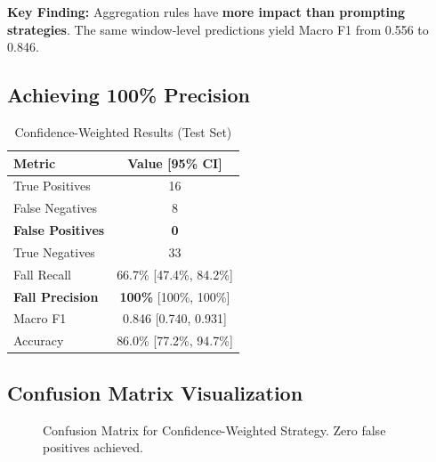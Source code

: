 \documentclass[conference]{IEEEtran}
\begin{document}
\textbf{Key Finding:} Aggregation rules have \textbf{more impact than prompting strategies}. The same window-level predictions yield Macro F1 from 0.556 to 0.846.

\subsection{Achieving 100\% Precision}

\begin{table}[H]
\centering
\caption{Confidence-Weighted Results (Test Set)}
\label{tab:confidence_results}
\begin{tabular}{lc}
\toprule
\textbf{Metric} & \textbf{Value [95\% CI]} \\
\midrule
True Positives & 16 \\
False Negatives & 8 \\
\textbf{False Positives} & \textbf{0} \\
True Negatives & 33 \\
\midrule
Fall Recall & 66.7\% [47.4\%, 84.2\%] \\
\textbf{Fall Precision} & \textbf{100\%} [100\%, 100\%] \\
Macro F1 & 0.846 [0.740, 0.931] \\
Accuracy & 86.0\% [77.2\%, 94.7\%] \\
\bottomrule
\end{tabular}
\end{table}

\subsection{Confusion Matrix Visualization}

\begin{figure}[H]
\centering
{}
\caption{Confusion Matrix for Confidence-Weighted Strategy. Zero false positives achieved.}
\label{fig:confusion}
\end{figure}
\end{document}
